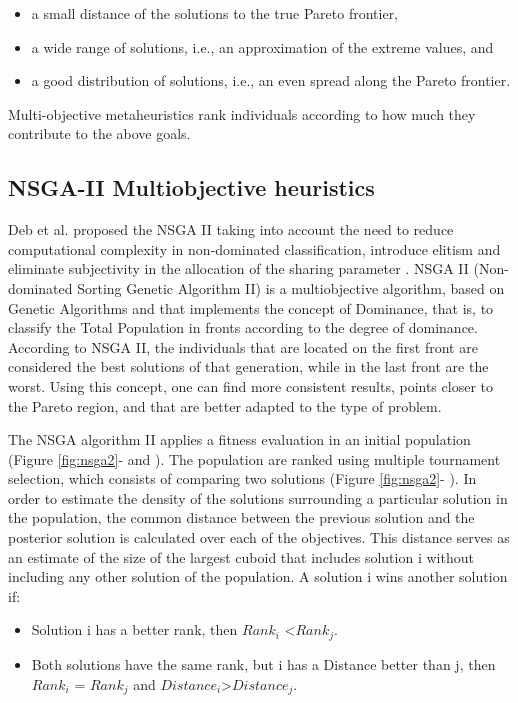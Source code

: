 \begin{itemize}
\item  a small distance of the solutions to the true Pareto frontier,
\item  a wide range of solutions, i.e., an approximation
of the extreme values, and
\item a good distribution of solutions, i.e., an even
spread along the Pareto frontier.
\end{itemize}

Multi-objective metaheuristics rank individuals according to how much they contribute to the above goals.

\subsection{NSGA-II Multiobjective heuristics}

Deb et al.  proposed the NSGA II taking into account the need to reduce computational complexity in non-dominated classification, introduce elitism and eliminate subjectivity in the allocation of the sharing parameter \cite{Deb2000}. NSGA II (Non-dominated Sorting Genetic Algorithm II)  is a multiobjective algorithm, based on Genetic Algorithms  and that implements the concept of Dominance, that is, to classify the Total Population in fronts according to the degree of dominance. According to NSGA II, the individuals that are located on the first front are considered the best solutions of that generation, while in the last front are the worst. Using this concept, one can find more consistent results, points closer to the Pareto region, and that are better adapted to the type of problem. 

The NSGA algorithm II applies a fitness evaluation in an initial population (Figure \ref{fig:nsga2}-  and ). The population are ranked using multiple tournament selection, which consists of comparing two solutions (Figure \ref{fig:nsga2}- ). In order to estimate the density of the solutions surrounding a particular solution in the population, the common distance between the previous solution and the posterior solution is calculated over each of the objectives. This distance serves as an estimate of the size of the largest cuboid that includes solution i without including any other solution of the population. A solution i wins another solution if:

\begin{itemize}
\item Solution i has a better rank, then $Rank_i$ <$Rank_j$.
\item Both solutions have the same rank, but i has a
Distance better than j, then $Rank_i$ = $Rank_j$ and $Distance_i$>$Distance_j$.
\end{itemize}

